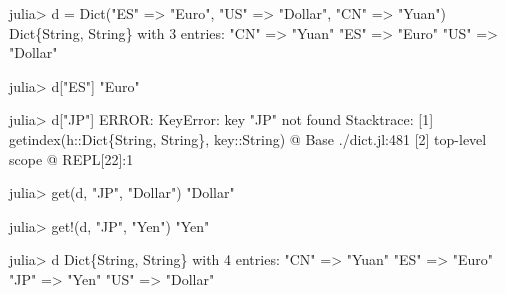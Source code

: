 \documentclass[
  letterpaper,
  DIV=11,
  numbers=noendperiod]{scrreprt}
\newenvironment{Shaded}{\begin{snugshade}}{\end{snugshade}}
\newcommand{\BuiltInTok}[1]{\textcolor[rgb]{0.00,0.23,0.31}{#1}}
\newcommand{\DataTypeTok}[1]{\textcolor[rgb]{0.68,0.00,0.00}{#1}}
\newcommand{\FloatTok}[1]{\textcolor[rgb]{0.68,0.00,0.00}{#1}}
\newcommand{\FunctionTok}[1]{\textcolor[rgb]{0.28,0.35,0.67}{#1}}
\newcommand{\NormalTok}[1]{\textcolor[rgb]{0.00,0.23,0.31}{#1}}
\newcommand{\OperatorTok}[1]{\textcolor[rgb]{0.37,0.37,0.37}{#1}}
\newcommand{\StringTok}[1]{\textcolor[rgb]{0.13,0.47,0.30}{#1}}
\begin{document}
\begin{Shaded}
\begin{Highlighting}[]
\NormalTok{julia}\OperatorTok{\textgreater{}}\NormalTok{ d }\OperatorTok{=} \FunctionTok{Dict}\NormalTok{(}\StringTok{"ES"} \OperatorTok{=\textgreater{}} \StringTok{"Euro"}\NormalTok{, }\StringTok{"US"} \OperatorTok{=\textgreater{}} \StringTok{"Dollar"}\NormalTok{, }\StringTok{"CN"} \OperatorTok{=\textgreater{}} \StringTok{"Yuan"}\NormalTok{)}
\DataTypeTok{Dict}\NormalTok{\{}\DataTypeTok{String}\NormalTok{, }\DataTypeTok{String}\NormalTok{\} with }\FloatTok{3}\NormalTok{ entries}\OperatorTok{:}
  \StringTok{"CN"} \OperatorTok{=\textgreater{}} \StringTok{"Yuan"}
  \StringTok{"ES"} \OperatorTok{=\textgreater{}} \StringTok{"Euro"}
  \StringTok{"US"} \OperatorTok{=\textgreater{}} \StringTok{"Dollar"}

\NormalTok{julia}\OperatorTok{\textgreater{}}\NormalTok{ d[}\StringTok{"ES"}\NormalTok{]}
\StringTok{"Euro"}

\NormalTok{julia}\OperatorTok{\textgreater{}}\NormalTok{ d[}\StringTok{"JP"}\NormalTok{]}
\NormalTok{ERROR}\OperatorTok{:} \DataTypeTok{KeyError}\OperatorTok{:}\NormalTok{ key }\StringTok{"JP"}\NormalTok{ not found}
\NormalTok{Stacktrace}\OperatorTok{:}
\NormalTok{ [}\FloatTok{1}\NormalTok{] }\FunctionTok{getindex}\NormalTok{(h}\OperatorTok{::}\DataTypeTok{Dict\{String, String\}}\NormalTok{, key}\OperatorTok{::}\DataTypeTok{String}\NormalTok{)}
\NormalTok{   @ }\BuiltInTok{Base} \OperatorTok{./}\NormalTok{dict.jl}\OperatorTok{:}\FloatTok{481}
\NormalTok{ [}\FloatTok{2}\NormalTok{] top}\OperatorTok{{-}}\NormalTok{level scope}
\NormalTok{   @ }\BuiltInTok{REPL}\NormalTok{[}\FloatTok{22}\NormalTok{]}\OperatorTok{:}\FloatTok{1}

\NormalTok{julia}\OperatorTok{\textgreater{}} \FunctionTok{get}\NormalTok{(d, }\StringTok{"JP"}\NormalTok{, }\StringTok{"Dollar"}\NormalTok{)}
\StringTok{"Dollar"}

\NormalTok{julia}\OperatorTok{\textgreater{}} \FunctionTok{get!}\NormalTok{(d, }\StringTok{"JP"}\NormalTok{, }\StringTok{"Yen"}\NormalTok{)}
\StringTok{"Yen"}

\NormalTok{julia}\OperatorTok{\textgreater{}}\NormalTok{ d}
\DataTypeTok{Dict}\NormalTok{\{}\DataTypeTok{String}\NormalTok{, }\DataTypeTok{String}\NormalTok{\} with }\FloatTok{4}\NormalTok{ entries}\OperatorTok{:}
  \StringTok{"CN"} \OperatorTok{=\textgreater{}} \StringTok{"Yuan"}
  \StringTok{"ES"} \OperatorTok{=\textgreater{}} \StringTok{"Euro"}
  \StringTok{"JP"} \OperatorTok{=\textgreater{}} \StringTok{"Yen"}
  \StringTok{"US"} \OperatorTok{=\textgreater{}} \StringTok{"Dollar"}
\end{Highlighting}
\end{Shaded}
\end{document}
